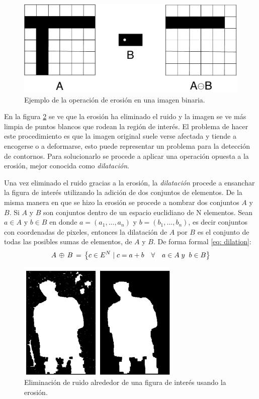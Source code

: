 \documentclass{book}
\begin{document}
\begin{figure}
\centering 
\includegraphics[scale=0.7]{images/erosion_diagram.pdf}
\caption{Ejemplo de la operación de erosión en una imagen binaria.}
\label{fig:erosion_diagram}
\end{figure}

En la figura \ref{fig:erosion_example} se ve que la erosión ha eliminado el ruido y la imagen se ve más limpia de puntos blancos que rodean la región de interés. El problema de hacer este procedimiento es que la imagen original suele verse afectada y tiende a encogerse o a deformarse, esto puede representar un problema para la detección de contornos. Para solucionarlo se procede a aplicar una operación opuesta a la erosión, mejor conocida como \textit{dilatación}.

Una vez eliminado el ruido gracias a la erosión, la \textit{dilatación} procede a ensanchar la figura de interés utilizando la adición de dos conjuntos de elementos. De la misma manera en que se hizo la erosión se procede a nombrar dos conjuntos $A$ y $B$. Si $A$ y $B$ son conjuntos dentro de un espacio euclidiano de N elementos. Sean $a \in A$ y $b \in B$ en donde $a=(a_1, ... ,a_n)$ y $b=(b_1,...,b_n)$, es decir conjuntos con coordenadas de pixeles, entonces la dilatación de $A$ por $B$ es el conjunto de todas las posibles sumas de elementos, de $A$ y $B$. De forma formal \ref{eq: dilation}:
\begin{equation}
A\thinspace\oplus\thinspace B\thinspace=\thinspace \left \{ c \in E^N  \mid c=a+b \quad\forall \quad a \in A \; y\; \; b \in B\right \}
\label{eq: dilation}
\end{equation}


\begin{figure}
\centering
\includegraphics[scale=1]{images/erosion_example.png}
\caption{Eliminación de ruido alrededor de una figura de interés usando la erosión.}
\label{fig:erosion_example}
\end{figure}
\end{document}
